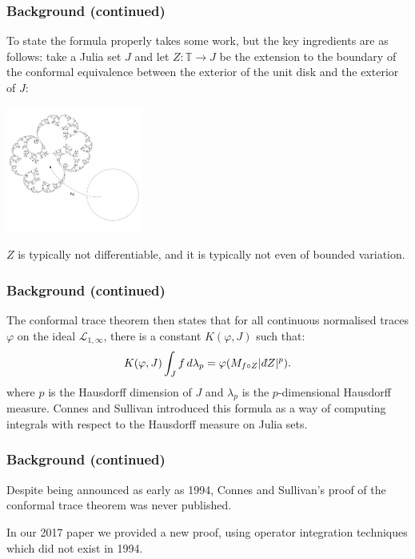\documentclass{beamer} %
\theoremstyle{definition} %
\newcommand{\Circ}{\mathbb{T}}
\newcommand{\Lc}{\mathcal{L}}
\newcommand{\FiniteRank}{\mathrm{FiniteRank}}
\newcommand{\SepPart}[1]{\overline{\FiniteRank}^{\Lc_{#1,\infty}}}
\def\qd{\,{\mathchar'26\mkern-12mu d}}
\begin{document}
\begin{frame}\frametitle{Background (continued)}
    To state the formula properly takes some work, but the key ingredients are as follows: take a Julia set $J$ and let $Z:\Circ\to J$ be the extension
    to the boundary of the conformal equivalence between the exterior of the unit disk and the exterior of $J$:
    \begin{center}
        \includegraphics[width=45mm]{img/riemann-mapping.png}
    \end{center}
    $Z$ is typically not differentiable, and it is typically not even of bounded variation.
\end{frame}

\begin{frame}\frametitle{Background (continued)}
    The conformal trace theorem then states that for all continuous normalised traces $\varphi$ on the ideal $\Lc_{1,\infty}$, there is a constant $K(\varphi,J)$ such that:
    \begin{equation*}
        K(\varphi,J)\int_J f\,d\lambda_p = \varphi(M_{f\circ Z}|\qd Z|^p).
    \end{equation*}
    where $p$ is the Hausdorff dimension of $J$ and $\lambda_p$ is the $p$-dimensional Hausdorff measure. Connes and Sullivan introduced this formula as a way of computing integrals with respect to the Hausdorff measure on Julia sets.
\end{frame}

\begin{frame}\frametitle{Background (continued)}
    Despite being announced as early as 1994, Connes and Sullivan's proof of the conformal trace theorem was never published.
    
    In our 2017 paper we provided a new proof, using operator integration techniques which did not exist in 1994.
\end{frame}

% 
\end{document}
